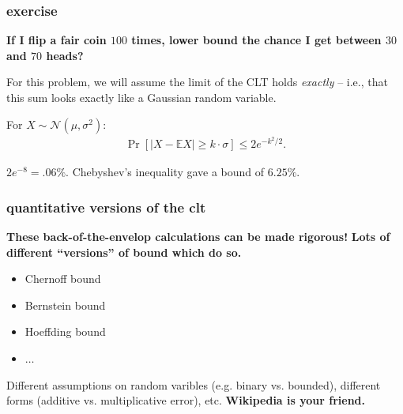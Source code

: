 \documentclass[compress]{beamer}
\newcommand{\E}{\mathbb{E}}
\begin{document}
\begin{frame}
	\frametitle{exercise}
	\small 
	\begin{center}
		\textbf{If I flip a fair coin $100$ times, lower bound the chance I get between $30$ and $70$ heads?}
	\end{center}
	
	For this problem, we will assume the limit of the CLT holds \emph{exactly} -- i.e., that this sum looks exactly like a Gaussian random variable.
	\begin{lemma}
		For $X \sim \mathcal{N}(\mu,\sigma^2)$:\vspace{-.5em}
		\begin{align*}
			\Pr[|X - \E X| \geq k\cdot\sigma] \leq 2e^{-k^2/2}.
		\end{align*}
	\end{lemma}
	\vspace{3em}
	$2e^{-8} = .06\%$. Chebyshev's inequality gave a bound of $6.25\%$. 
\end{frame}



\begin{frame}
	\frametitle{quantitative versions of the clt}
	\textbf{These back-of-the-envelop calculations can be made rigorous!}
	\textbf{\alert{Lots of different ``versions'' of bound which do so.}}
		\begin{center}
			\begin{itemize}
				\item Chernoff bound
				\item Bernstein bound
				\item Hoeffding bound
				\item $\ldots$
			\end{itemize}
			Different assumptions on random varibles (e.g. binary vs. bounded), different forms (additive vs. multiplicative error), etc. \textbf{Wikipedia is your friend.}
		\end{center}
\end{frame}
\end{document}
